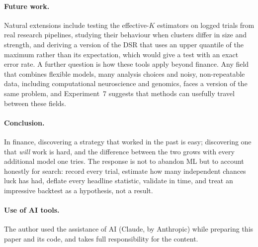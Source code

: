 \documentclass[11pt]{article}
\begin{document}
\paragraph{Future work.} Natural extensions include testing the effective-$K$ estimators on logged trials from real research pipelines, studying their behaviour when clusters differ in size and strength, and deriving a version of the DSR that uses an upper quantile of the maximum rather than its expectation, which would give a test with an exact error rate. A further question is how these tools apply beyond finance. Any field that combines flexible models, many analysis choices and noisy, non-repeatable data, including computational neuroscience and genomics, faces a version of the same problem, and Experiment~7 suggests that methods can usefully travel between these fields.

\paragraph{Conclusion.} In finance, discovering a strategy that worked in the past is easy; discovering one that \emph{will} work is hard, and the difference between the two grows with every additional model one tries. The response is not to abandon ML but to account honestly for search: record every trial, estimate how many independent chances luck has had, deflate every headline statistic, validate in time, and treat an impressive backtest as a hypothesis, not a result.

\paragraph{Use of AI tools.} The author used the assistance of AI (Claude, by Anthropic) while preparing this paper and its code, and takes full responsibility for the content.
\end{document}
